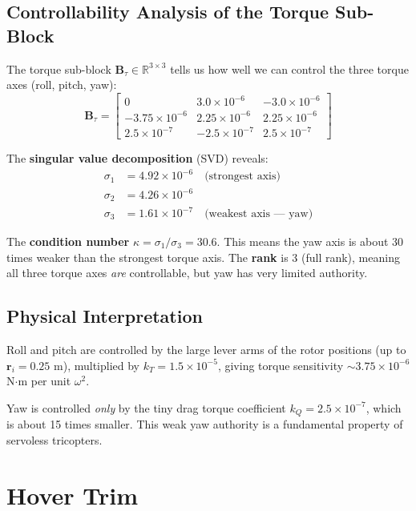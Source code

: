 \documentclass[12pt, a4paper]{article}
\newcommand{\R}{\mathbb{R}}
\newcommand{\bB}{\bm{B}}
\begin{document}
\subsection{Controllability Analysis of the Torque Sub-Block}

The torque sub-block $\bB_\tau \in \R^{3 \times 3}$ tells us how well we can control the three torque axes (roll, pitch, yaw):
\begin{equation}
    \bB_\tau = \begin{bmatrix}
        0 & 3.0\times10^{-6} & -3.0\times10^{-6} \\
        -3.75\times10^{-6} & 2.25\times10^{-6} & 2.25\times10^{-6} \\
        2.5\times10^{-7} & -2.5\times10^{-7} & 2.5\times10^{-7}
    \end{bmatrix}
\end{equation}

The \textbf{singular value decomposition} (SVD) reveals:
\begin{align}
    \sigma_1 &= 4.92 \times 10^{-6} \quad \text{(strongest axis)} \\
    \sigma_2 &= 4.26 \times 10^{-6} \\
    \sigma_3 &= 1.61 \times 10^{-7} \quad \text{(weakest axis --- yaw)}
\end{align}

The \textbf{condition number} $\kappa = \sigma_1 / \sigma_3 = 30.6$.  This means the yaw axis is about 30 times weaker than the strongest torque axis.  The \textbf{rank} is 3 (full rank), meaning all three torque axes \emph{are} controllable, but yaw has very limited authority.

\subsection{Physical Interpretation}

Roll and pitch are controlled by the large lever arms of the rotor positions (up to $\bm{r}_i = 0.25$ m), multiplied by $k_T = 1.5 \times 10^{-5}$, giving torque sensitivity $\sim 3.75 \times 10^{-6}$ N$\cdot$m per unit $\omega^2$.

Yaw is controlled \emph{only} by the tiny drag torque coefficient $k_Q = 2.5 \times 10^{-7}$, which is about 15 times smaller.  This weak yaw authority is a fundamental property of servoless tricopters.

\section{Hover Trim}
\label{sec:trim}
\end{document}
